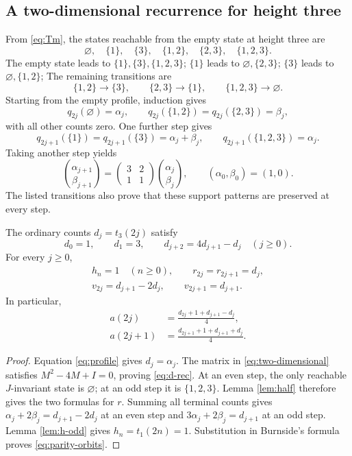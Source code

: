 \subsection{A two-dimensional recurrence for height three}
From \eqref{eq:Tm}, the states reachable from the empty state
at height three are
\[
\varnothing,\quad\{1\},\quad\{3\},\quad\{1,2\},\quad\{2,3\},\quad\{1,2,3\}.
\]
The empty state leads to $\{1\},\{3\},\{1,2,3\}$;
$\{1\}$ leads to $\varnothing,\{2,3\}$;
$\{3\}$ leads to $\varnothing,\{1,2\}$;
The remaining transitions are
\[
\{1,2\}\longrightarrow\{3\},\qquad
\{2,3\}\longrightarrow\{1\},\qquad
\{1,2,3\}\longrightarrow\varnothing.
\]
Starting from the empty profile, induction gives
\[
 q_{2j}(\varnothing)=\alpha_j,\qquad
 q_{2j}(\{1,2\})=q_{2j}(\{2,3\})=\beta_j,
\]
with all other counts zero. One further step gives
\[
 q_{2j+1}(\{1\})=q_{2j+1}(\{3\})=\alpha_j+\beta_j,\qquad
 q_{2j+1}(\{1,2,3\})=\alpha_j.
\]
Taking another step yields
\begin{equation}\label{eq:two-dimensional}
 \binom{\alpha_{j+1}}{\beta_{j+1}}
 =\begin{pmatrix}3&2\\1&1\end{pmatrix}
 \binom{\alpha_j}{\beta_j},\qquad
 (\alpha_0,\beta_0)=(1,0).
\end{equation}
The listed transitions also prove that these support patterns
are preserved at every step.

\begin{proposition}\label{prop:parity}
The ordinary counts $d_j=t_3(2j)$ satisfy
\begin{equation}\label{eq:d-rec}
 d_0=1,\qquad d_1=3,\qquad
 d_{j+2}=4d_{j+1}-d_j\quad(j\ge0).
\end{equation}
For every $j\ge0$,
\begin{equation}\label{eq:parity-fixed}
\begin{gathered}
 h_n=1\quad(n\ge0),\qquad r_{2j}=r_{2j+1}=d_j,\\
 v_{2j}=d_{j+1}-2d_j,\qquad v_{2j+1}=d_{j+1}.
\end{gathered}
\end{equation}
In particular,
\begin{equation}\label{eq:parity-orbits}
\begin{split}
 a(2j)&=\frac{d_{2j}+1+d_{j+1}-d_j}{4},\\
 a(2j+1)&=\frac{d_{2j+1}+1+d_{j+1}+d_j}{4}.
\end{split}
\end{equation}
\end{proposition}
\begin{proof}
Equation \eqref{eq:profile} gives $d_j=\alpha_j$.
The matrix in \eqref{eq:two-dimensional} satisfies
$M^2-4M+I=0$, proving \eqref{eq:d-rec}.
At an even step, the only reachable $J$-invariant state is
$\varnothing$; at an odd step it is $\{1,2,3\}$.
Lemma \ref{lem:half} therefore gives the two formulas for $r$.
Summing all terminal counts gives
$\alpha_j+2\beta_j=d_{j+1}-2d_j$ at an even step and
$3\alpha_j+2\beta_j=d_{j+1}$ at an odd step.
Lemma \ref{lem:h-odd} gives $h_n=t_1(2n)=1$.
Substitution in Burnside's formula proves \eqref{eq:parity-orbits}.
\end{proof}

